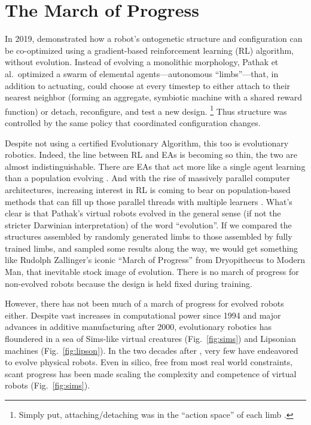 \section{The March of Progress}


In 2019, \citet{pathak2019learning} demonstrated how a robot's 
ontogenetic structure and configuration
can be co-optimized using a gradient-based reinforcement learning (RL) algorithm, without evolution.
Instead of evolving a monolithic morphology, Pathak et al.~optimized a swarm of elemental agents---autonomous ``limbs''---that, in addition to actuating, could choose at every timestep to either attach to their nearest neighbor (forming an aggregate, symbiotic machine with a shared reward function) or detach, reconfigure, and test a new design.%
\footnote{%
Simply put,
attaching/detaching was in the ``action space'' of each limb \cite{sutton2018reinforcement}.
}
Thus structure was controlled by the same policy that coordinated 
configuration changes.


Despite not using a certified Evolutionary Algorithm, this too is evolutionary robotics.
Indeed, the line between RL and EAs 
is becoming so thin, the two are almost indistinguishable.
There are EAs that act more like a single agent learning than a population evolving \cite{salimans2017evolution}.
And with the rise of massively parallel computer architectures,
increasing interest in RL is coming to bear on population-based methods that can fill up those parallel threads with multiple learners  \cite{jaderberg2019human}.
What's clear is that Pathak's virtual robots evolved in the general sense (if not the stricter Darwinian interpretation) of the word ``evolution''.
If we compared the structures assembled by randomly generated limbs to those assembled by fully trained limbs, and sampled some results along the way, we would get something like Rudolph Zallinger's iconic ``March of Progress'' from Dryopithecus to Modern Man, that inevitable stock image of evolution.
There is no march of progress for non-evolved robots because the design is held fixed during training.



However, there has not been much of a march of progress for evolved robots either.
Despite vast increases in computational power since 1994
and major advances in additive manufacturing after 2000,
evolutionary robotics has floundered in a sea of Sims-like virtual creatures (Fig.~\ref{fig:sims}) and Lipsonian machines (Fig.~\ref{fig:lipson}).
In the two decades after \citet{lipson2000automatic},
very few \cite{hornby2003generative,paul2006design,hiller2012automatic,faina2013edhmor,brodbeck2015morphological,cellucci20171d} have endeavored to evolve physical robots.
Even in silico,
free from most real world constraints,
scant progress has been made scaling the complexity and competence
of virtual robots \cite{cheney2016difficulty} (Fig.~\ref{fig:sims}).


